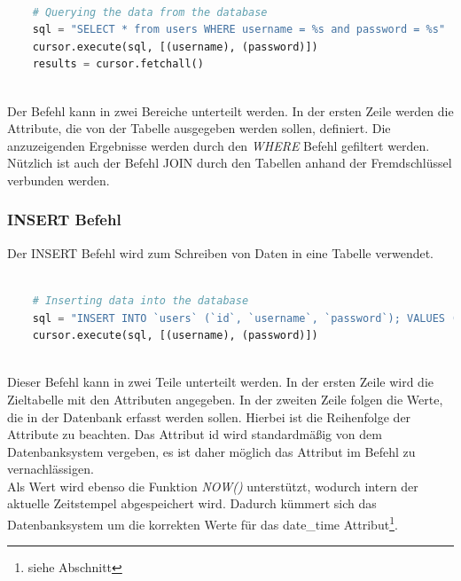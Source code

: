 \begin{lstlisting}[language=Python, caption={SELECT Befehl über MySQL Connector},captionpos=b]
		
	# Querying the data from the database
	sql = "SELECT * from users WHERE username = %s and password = %s"
	cursor.execute(sql, [(username), (password)])
	results = cursor.fetchall()
	
\end{lstlisting}

Der Befehl kann in zwei Bereiche unterteilt werden. In der ersten Zeile werden die
Attribute, die von der Tabelle ausgegeben werden sollen, definiert.  Die anzuzeigenden Ergebnisse werden durch den \textit{WHERE} Befehl gefiltert werden.
\\ Nützlich ist auch der Befehl JOIN durch den Tabellen anhand der Fremdschlüssel verbunden werden.

\subsubsection{INSERT Befehl}

Der INSERT Befehl wird zum Schreiben von Daten in eine Tabelle verwendet.

\begin{lstlisting}[language=Python, caption={INSERT Befehl über MySQL Connector},captionpos=b]
	
	# Inserting data into the database
	sql = "INSERT INTO `users` (`id`, `username`, `password`); VALUES (1, %s, %s);"
	cursor.execute(sql, [(username), (password)])
	
\end{lstlisting}

Dieser Befehl kann in zwei Teile unterteilt werden. In der ersten Zeile wird die Zieltabelle mit den Attributen angegeben. In der zweiten Zeile folgen die Werte, die in der Datenbank erfasst werden sollen. Hierbei ist die Reihenfolge der Attribute zu beachten. Das Attribut id wird standardmäßig von dem Datenbanksystem vergeben, es ist daher möglich das Attribut im Befehl zu vernachlässigen. \\
Als Wert wird ebenso die Funktion \textit{NOW()} unterstützt, wodurch intern der aktuelle Zeitstempel abgespeichert wird. Dadurch kümmert sich das Datenbanksystem um die korrekten Werte für das date\_time Attribut\footnote{siehe Abschnitt }.

\newpage